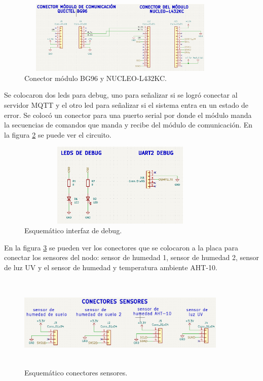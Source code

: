 \begin{figure}[h]
  \centering
	\includegraphics[width=10cm, height=3.5cm]{./Figures/esquematico_modulos.png}
	\caption{Conector módulo BG96 y NUCLEO-L432KC.}
	\label{fig:esquematico modulos}
\end{figure}

Se colocaron dos leds para debug, uno para señalizar si se logró conectar al servidor MQTT y el otro led para señalizar si el sistema entra en un estado de error. Se colocó un conector para una puerto serial por donde el módulo manda la secuencias de comandos que manda y recibe del módulo de comunicación. En la figura \ref{fig:esquematico conectores de debug} se puede ver el circuito.
\begin{figure}[h!]
  \centering
	\includegraphics[width=10cm, height=4cm]{./Figures/esquematico_debug.png}
	\caption{Esquemático interfaz de debug.}
	\label{fig:esquematico conectores de debug}
\end{figure}

En la figura \ref{fig:esquematico conectores sensores} se pueden ver los conectores que se colocaron a la placa para conectar los sensores del nodo: sensor de humedad 1, sensor de humedad 2, sensor de luz UV y el sensor de humedad y temperatura ambiente AHT-10.
\begin{figure}[h]
  \centering
	\includegraphics[width=10cm, height=4.5cm]{./Figures/conectores_sensores.png}
	\caption{Esquemático conectores sensores.}
	\label{fig:esquematico conectores sensores}
\end{figure}


